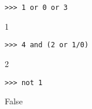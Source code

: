 \begin{lstlisting}
>>> 1 or 0 or 3
\end{lstlisting}
\begin{solution}[.2in]
1
\end{solution}

\begin{lstlisting}
>>> 4 and (2 or 1/0)
\end{lstlisting}
\begin{solution}[.2in]
2
\end{solution}

\begin{lstlisting}
>>> not 1
\end{lstlisting}
\begin{solution}[.2in]
False
\end{solution}